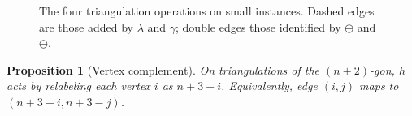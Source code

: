 \documentclass[a4paper,11pt]{article}
\newtheorem{proposition}[theorem]{Proposition}
\theoremstyle{definition}
\begin{document}
\begin{figure}[htbp]
\caption{The four triangulation operations on small instances. Dashed edges are
those added by $\lambda$ and $\gamma$; double edges those identified by $\oplus$
and $\ominus$.}
\label{fig:tri-operations}
\end{figure}

\begin{proposition}[Vertex complement]\label{prop:vertex-complement}
On triangulations of the $(n{+}2)$-gon, $h$ acts by
relabeling each vertex $i$ as $n+3-i$. Equivalently,
edge $(i,j)$ maps to $(n+3-i, n+3-j)$.
\end{proposition}
\end{document}
